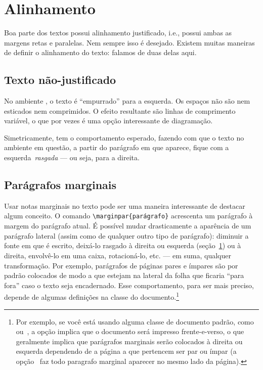 \section{Alinhamento}\label{sec:alinhamento}

Boa parte dos textos possui alinhamento justificado, i.e., possui
ambas as margens retas e paralelas. Nem sempre isso é
desejado. Existem muitas maneiras de definir o alinhamento do texto:
falamos de duas delas aqui.

\subsection{Texto não-justificado}

\begin{flushleft}
No ambiente
, o texto é
``empurrado'' para a esquerda. Os espaços não são nem esticados nem
comprimidos. O efeito resultante são linhas de comprimento variável, o
que por vezes é uma opção interessante de diagramação.
\end{flushleft}

\begin{flushright}
Simetricamente,
 tem o
comportamento esperado, fazendo com que o texto no ambiente em
questão, a partir do parágrafo em que aparece, fique com a
esquerda~\emph{rasgada} --- ou seja, para a direita.
\end{flushright}

\subsection{Parágrafos marginais}

Usar  notas
marginais no texto pode ser uma maneira interessante de destacar algum
conceito. O comando \verb'\marginpar{parágrafo}' acrescenta um
parágrafo à margem do parágrafo atual. É possível mudar drasticamente
a aparência de um parágrafo lateral (assim como de qualquer outro tipo
de parágrafo): diminuir a fonte em que é escrito, deixá-lo rasgado à
direita ou esquerda (seção~\ref{sec:alinhamento}) ou à direita,
envolvê-lo em uma caixa,
rotacioná-lo, etc. ---
em suma, qualquer transformação. Por exemplo, parágrafos de páginas
pares e ímpares são por padrão colocados de modo a que estejam na
lateral da folha que ficaria ``para fora'' caso o texto seja
encadernado. Esse comportamento, para ser mais preciso, depende de
algumas definições na classe do documento.\footnote{Por exemplo, se
  você está usando alguma  classe de documento padrão,
  como~ ou~, a opção
   implica que o documento será impresso
  frente-e-verso, o que geralmente implica que parágrafos marginais
  serão colocados à direita ou esquerda dependendo de a página a que
  pertencem ser par ou ímpar (a opção~ faz todo
  paragrafo marginal aparecer no mesmo lado da página).}
